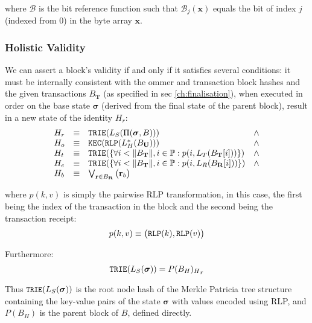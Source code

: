 \documentclass[9pt,oneside]{amsart}
\begin{document}
\begin{multicols}{2}
where $\mathcal{B}$ is the bit reference function such that $\mathcal{B}_j(\mathbf{x})$ equals the bit of index $j$ (indexed from 0) in the byte array $\mathbf{x}$.

\subsubsection{Holistic Validity}

We can assert a block's validity if and only if it satisfies several conditions: it must be internally consistent with the ommer and transaction block hashes and the given transactions $B_\mathbf{T}$ (as specified in sec \ref{ch:finalisation}), when executed in order on the base state $\boldsymbol{\sigma}$ (derived from the final state of the parent block), result in a new state of the identity $H_r$:
\begin{equation}
\begin{array}[t]{lclc}
H_r &\equiv& \mathtt{\small TRIE}(L_S(\Pi(\boldsymbol{\sigma}, B))) & \wedge \\
H_o &\equiv& \mathtt{\small KEC}(\mathtt{\small RLP}(L_H^*(B_\mathbf{U}))) & \wedge \\
H_t &\equiv& \mathtt{\small TRIE}(\{\forall i < \lVert B_\mathbf{T} \rVert, i \in \mathbb{P}: p(i, L_T(B_\mathbf{T}[i]))\}) & \wedge \\
H_e &\equiv& \mathtt{\small TRIE}(\{\forall i < \lVert B_\mathbf{T} \rVert, i \in \mathbb{P}: p(i, L_R(B_\mathbf{R}[i]))\}) & \wedge \\
H_b &\equiv& \bigvee_{\mathbf{r} \in B_\mathbf{R}} \big( \mathbf{r}_b \big)
\end{array}
\end{equation}

where $p(k, v)$ is simply the pairwise RLP transformation, in this case, the first being the index of the transaction in the block and the second being the transaction receipt:
\begin{equation}
p(k, v) \equiv \big( \mathtt{\small RLP}(k), \mathtt{\small RLP}(v) \big)
\end{equation}

Furthermore:
\begin{equation}
\mathtt{\small TRIE}(L_S(\boldsymbol{\sigma})) = {P(B_H)_H}_r
\end{equation}

Thus $\texttt{\small TRIE}(L_S(\boldsymbol{\sigma}))$ is the root node hash of the Merkle Patricia tree structure containing the key-value pairs of the state $\boldsymbol{\sigma}$ with values encoded using RLP, and $P(B_H)$ is the parent block of $B$, defined directly.


\end{multicols}
\end{document}
